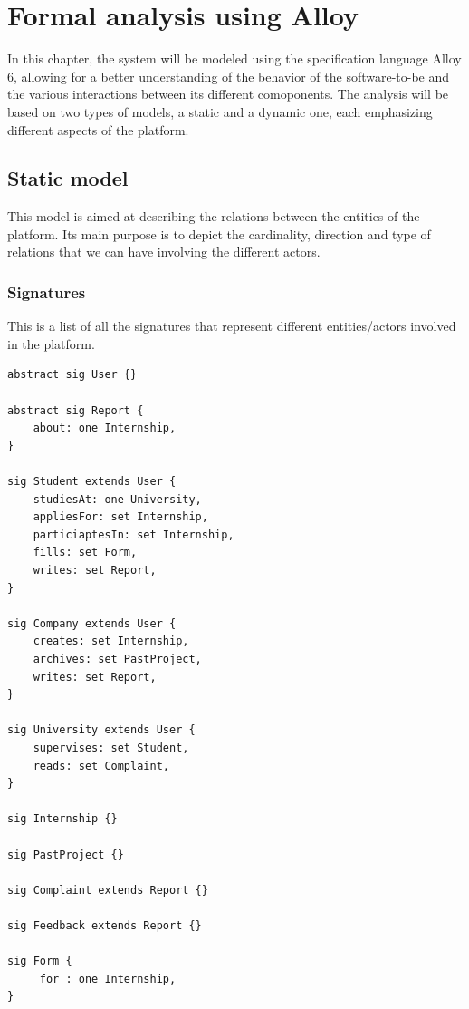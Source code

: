 \documentclass[11pt,twoside]{article}
\begin{document}
\newpage
		
\section{Formal analysis using Alloy}
In this chapter, the system will be modeled using the specification language Alloy 6, allowing for a better understanding of the behavior of the software-to-be and the various interactions between its different comoponents. The analysis will be based on two types of models, a static and a dynamic one, each emphasizing different aspects of the platform.
	\subsection{Static model}
This model is aimed at describing the relations between the entities of the platform. Its main purpose is to depict the cardinality, direction and type of relations that we can have involving the different actors.
		\subsubsection{Signatures}
This is a list of all the signatures that represent different entities/actors involved in the platform.
{\small
\begin{verbatim}
abstract sig User {}

abstract sig Report {
    about: one Internship,
}

sig Student extends User {
	studiesAt: one University,
    appliesFor: set Internship,
    particiaptesIn: set Internship,
    fills: set Form,
    writes: set Report,
}

sig Company extends User {
    creates: set Internship,
    archives: set PastProject,
    writes: set Report,
}

sig University extends User {
    supervises: set Student,
    reads: set Complaint,
}

sig Internship {}

sig PastProject {}

sig Complaint extends Report {}

sig Feedback extends Report {}

sig Form {
    _for_: one Internship,
}
\end{verbatim}}
\end{document}
